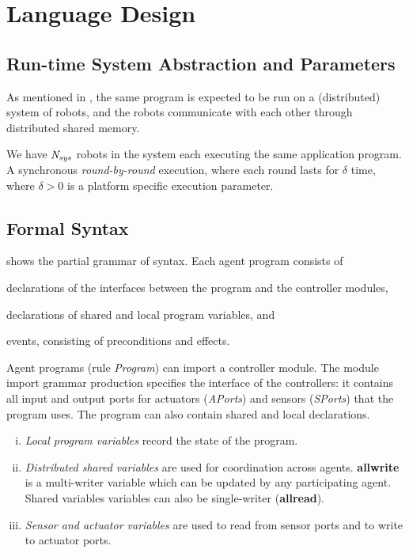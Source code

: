 \section{\lgname Language Design}
\label{sec:language}


\subsection{Run-time System Abstraction and Parameters}

As mentioned in , the same \lgname program is expected to be run on a (distributed) system of robots,
and the robots communicate with each other through distributed shared memory.

%
We have $\mathit{N_{sys}}$ robots in the system each executing the same \lgname application program.
A synchronous \emph{round-by-round} execution,
where each round lasts for $\delta$ time, where $\delta >0$ is a platform specific execution parameter.


\subsection{Formal Syntax}\label{sec:syntax}

 shows the partial grammar of \lgname syntax.
Each agent program consists of
\begin{inparaenum}[(a)]
\item declarations of the interfaces between the program and the controller modules,
\item declarations of shared and local program variables, and
\item events, consisting of preconditions and effects.
\end{inparaenum}
Agent programs (rule \emph{Program}) can import a controller module.
The module import grammar production specifies the interface of the controllers:
it contains all input and output ports for actuators (\emph{APorts}) and sensors (\emph{SPorts}) that the program uses.
The program can also contain shared and local declarations.

\begin{enumerate}[i)]
\item \emph{Local program variables} record the state of the program.
\item \emph{Distributed shared variables} are used for coordination across agents.
      \textbf{allwrite} is a multi-writer variable which can be updated by any participating agent.
      Shared variables variables can also be single-writer (\textbf{allread}).
\item \emph{Sensor and actuator variables} are used to read from sensor ports and to write to actuator ports.
\end{enumerate}

